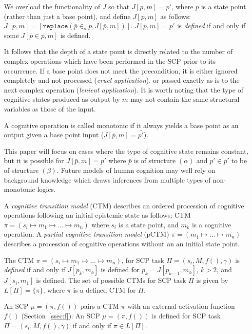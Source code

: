 We overload the functionality of $J$ so that $J[p,m]=p'$, where $p$ is a state point (rather than just a base point), and define $J[p,m]$ as follows: $J[p,m]=[ \texttt{replace}(\bar{p} \in_s p,J[\bar{p},m])]$. $J[p,m]=p'$ is \textit{defined} if and only if some $J[\bar{p} \in p,m]$ is defined.

It follows that the depth of a state point is directly related to the number of complex operations which have been performed in the SCP prior to its occurrence. If a base point does not meet the precondition, it is either ignored completely and not processed (\textit{cruel application}), or passed exactly as is to the next complex operation (\textit{lenient application}). It is worth noting that the type of cognitive states produced as output by $m$ may not contain the same structural variables as those of the input.
 
A cognitive operation is called monotonic if it always yields a base point as an output given a base point input ($J[\bar{p},m]=\bar{p'}$).

This paper will focus on cases where the type of cognitive state remains constant, but it is possible for $J[\bar{p},m]=p'$ where $\bar{p}$ is of structure $(\alpha)$ and $\bar{p'}\in p'$ to be of structure $(\beta)$. Future models of human cognition may well rely on background knowledge which draws inferences from multiple types of non-monotonic logics.

A \textit{cognitive transition model} (CTM) describes an ordered procession of cognitive operations following an initial epistemic state as follows: CTM $\pi=(s_i\longmapsto m_1\longmapsto ...\longmapsto m_n)$ where $s_i$ is a state point, and $m_k$ is a cognitive operation. A \textit{partial cognitive transition model} (pCTM) $\pi=(m_1\longmapsto ...\longmapsto m_n)$ describes a procession of cognitive operations without an an initial state point.

The CTM $\pi = (s_i\longmapsto m_1 \longmapsto ...\longmapsto m_n)$, for SCP task $\Pi=(s_i, M, f(), \gamma)$ is \textit{defined} if and only if $J[p_k,m_k]$ is defined for $p_k = J[p_{k-1},m_k]$, $k>2$, and $J[s_i,m_1]$ is defined. The set of possible CTMs for SCP task $\Pi$ is given by $L[\Pi]=\{\pi\}$, where $\pi$ is a defined CTM for $\Pi$.

An SCP $\mu=(\pi,f())$  pairs a CTM $\pi$ with an external activation function $f()$ (Section~\ref{ssec:f}). An SCP $\mu=(\pi,f())$ is defined for SCP task $\Pi=(s_i, M, f(), \gamma)$ if and only if $\pi \in L[\Pi]$.



